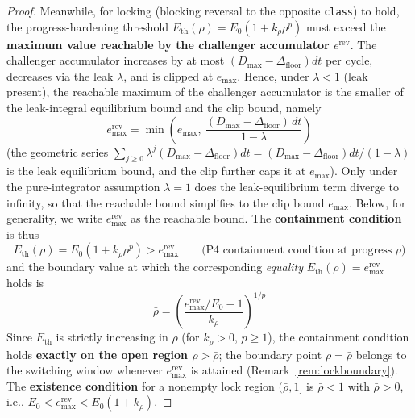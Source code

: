 \documentclass[11pt]{article}
\newcommand{\Class}{\texttt{class}}
\newcommand{\Dfloor}{\Delta_{\text{floor}}}
\newcommand{\Erev}{e^{\text{rev}}}
\newcommand{\Eremax}{e^{\text{rev}}_{\max}}
\newcommand{\Eth}{E_{\text{th}}}
\begin{document}
\begin{proof}
Meanwhile, for locking (blocking reversal to the opposite \Class) to hold, the progress-hardening threshold $\Eth(\rho) = E_0(1+k_\rho \rho^p)$ must exceed the \textbf{maximum value reachable by the challenger accumulator $\Erev$}. The challenger accumulator increases by at most $(D_{\max}-\Dfloor)dt$ per cycle, decreases via the leak $\lambda$, and is clipped at $e_{\max}$. Hence, under $\lambda < 1$ (leak present), the reachable maximum of the challenger accumulator is the smaller of the leak-integral equilibrium bound and the clip bound, namely
\begin{equation}
\Eremax = \min\!\left(e_{\max},\ \frac{(D_{\max}-\Dfloor)\, dt}{1-\lambda}\right)
\label{eq:eremax}
\end{equation}
(the geometric series $\sum_{j\ge0} \lambda^j (D_{\max}-\Dfloor)dt = (D_{\max}-\Dfloor)dt/(1-\lambda)$ is the leak equilibrium bound, and the clip further caps it at $e_{\max}$). Only under the pure-integrator assumption $\lambda = 1$ does the leak-equilibrium term diverge to infinity, so that the reachable bound simplifies to the clip bound $e_{\max}$. Below, for generality, we write $\Eremax$ as the reachable bound. The \textbf{containment condition} is thus
\begin{equation}
\Eth(\rho) = E_0(1+k_\rho \rho^p) > \Eremax \qquad \text{(P4 containment condition at progress $\rho$)}
\end{equation}
and the boundary value at which the corresponding \emph{equality} $\Eth(\bar\rho) = \Eremax$ holds is
\begin{equation}
\bar\rho = \left(\frac{\Eremax/E_0 - 1}{k_\rho}\right)^{1/p}
\end{equation}
Since $\Eth$ is strictly increasing in $\rho$ (for $k_\rho > 0$, $p \ge 1$), the containment condition holds \textbf{exactly on the open region $\rho > \bar\rho$}; the boundary point $\rho = \bar\rho$ belongs to the switching window whenever $\Eremax$ is attained (Remark~\ref{rem:lockboundary}). The \textbf{existence condition} for a nonempty lock region $(\bar\rho, 1]$ is $\bar\rho < 1$ with $\bar\rho > 0$, i.e., $E_0 < \Eremax < E_0(1+k_\rho)$.


\end{proof}
\end{document}

